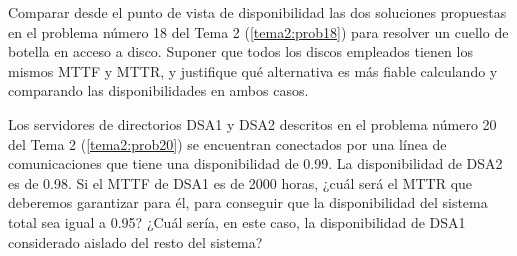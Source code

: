 \begin{problem}[9]
Comparar desde el punto de vista de disponibilidad las dos soluciones propuestas en el problema número 18 del Tema 2 (\ref{tema2:prob18})
 para resolver un cuello de botella en acceso a disco. Suponer que todos
 los discos empleados tienen los mismos MTTF y MTTR, y justifique qué
alternativa es más fiable calculando y comparando las disponibilidades
en ambos casos.

\solution


\end{problem}

\begin{problem}[10]
Los servidores de directorios DSA1 y DSA2 descritos en el problema número 20 del Tema 2 (\ref{tema2:prob20})
 se encuentran conectados por una línea de comunicaciones que tiene una
disponibilidad de 0.99. La disponibilidad de DSA2 es de 0.98. Si el MTTF
 de DSA1 es de 2000 horas, ¿cuál será el MTTR que deberemos garantizar
para él, para conseguir que la disponibilidad del sistema total sea
igual a 0.95? ¿Cuál sería, en este caso, la disponibilidad de DSA1
considerado aislado del resto del sistema?

\solution


\end{problem}

